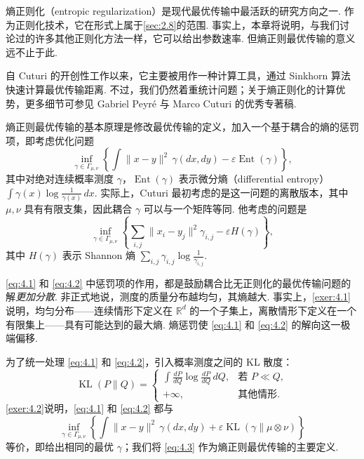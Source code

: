 熵正则化（entropic regularization）是现代最优传输中最活跃的研究方向之一. 作为正则化技术，它在形式上属于\autoref{sec:2.8}的范围. 事实上，本章将说明，与我们讨论过的许多其他正则化方法一样，它可以给出参数速率. 但熵正则最优传输的意义远不止于此.

自 Cuturi 的开创性工作\cite{ref97}以来，它主要被用作一种计算工具，通过 Sinkhorn 算法快速计算最优传输距离. 不过，我们仍然着重统计问题；关于熵正则化的计算优势，更多细节可参见 Gabriel Peyr\'e 与 Marco Cuturi 的优秀专著稿\cite{ref257}.

熵正则最优传输的基本原理是修改最优传输的定义，加入一个基于耦合的熵的惩罚项，即考虑优化问题
\begin{equation}\label{eq:4.1}
\inf_{\gamma\in\Gamma_{\mu,\nu}}\left\{\int\|x-y\|^2\,\gamma(dx,dy)-\varepsilon\operatorname{Ent}(\gamma)\right\},
\end{equation}
其中对绝对连续概率测度 $\gamma$，$\operatorname{Ent}(\gamma)$ 表示微分熵（differential entropy）$\int\gamma(x)\log\frac1{\gamma(x)}\,dx$. 实际上，Cuturi 最初考虑的是这一问题的离散版本，其中 $\mu,\nu$ 具有有限支集，因此耦合 $\gamma$ 可以与一个矩阵等同. 他考虑的问题是
\begin{equation}\label{eq:4.2}
\inf_{\gamma\in\Gamma_{\mu,\nu}}\left\{\sum_{i,j}\|x_i-y_j\|^2\gamma_{i,j}-\varepsilon H(\gamma)\right\},
\end{equation}
其中 $H(\gamma)$ 表示 Shannon 熵 $\sum_{i,j}\gamma_{i,j}\log\frac1{\gamma_{i,j}}$.

\eqref{eq:4.1} 和 \eqref{eq:4.2} 中惩罚项的作用，都是鼓励耦合比无正则化的最优传输问题的解\emph{更加分散}. 非正式地说，测度的质量分布越均匀，其熵越大. 事实上，\autoref{exer:4.1}说明，均匀分布——连续情形下定义在 $\mathbb R^d$ 的一个子集上，离散情形下定义在一个有限集上——具有可能达到的最大熵. 熵惩罚使 \eqref{eq:4.1} 和 \eqref{eq:4.2} 的解向这一极端偏移.

为了统一处理 \eqref{eq:4.1} 和 \eqref{eq:4.2}，引入概率测度之间的 KL 散度：
$$\operatorname{KL}(P\|Q)=\begin{cases}
\displaystyle\int\frac{dP}{dQ}\log\frac{dP}{dQ}\,dQ,&\text{若 }P\ll Q,\\
+\infty,&\text{其他情形.}
\end{cases}$$
\autoref{exer:4.2}说明，\eqref{eq:4.1} 和 \eqref{eq:4.2} 都与
\begin{equation}\label{eq:4.3}
\inf_{\gamma\in\Gamma_{\mu,\nu}}\left\{\int\|x-y\|^2\,\gamma(dx,dy)
+\varepsilon\operatorname{KL}(\gamma\|\mu\otimes\nu)\right\}
\end{equation}
等价，即给出相同的最优 $\gamma$；我们将 \eqref{eq:4.3} 作为熵正则最优传输的主要定义.

